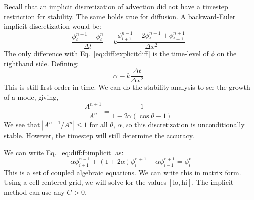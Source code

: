 Recall that an implicit discretization of advection did not have a
timestep restriction for stability.  The same holds true for
diffusion.  A backward-Euler implicit discretization would be:
\begin{equation}
\label{eq:diff:foimplicit}
\frac{\phi_i^{n+1} - \phi_i^n}{\Delta t} = 
  k \frac{\phi_{i+1}^{n+1} - 2\phi_i^{n+1} + \phi_{i-1}^{n+1}}{\Delta x^2}
\end{equation}
The only difference with Eq.~\ref{eq:diff:explicitdiff} is the
time-level of $\phi$ on the righthand side.  Defining:
\begin{equation}
\alpha \equiv k \frac{\Delta t}{\Delta x^2}
\end{equation}
This is still first-order in time.  We can do the stability analysis
to see the growth of a mode, giving,
\begin{equation}
\frac{A^{n+1}}{A^n} = \frac{1}{1 - 2\alpha (\cos\theta - 1)}
\end{equation}
We see that $|A^{n+1}/A^n| \le 1$ for all $\theta$, $\alpha$, so this
discretization is unconditionally stable.  However, the timestep will
still determine the accuracy.

We can write Eq.~\ref{eq:diff:foimplicit} as:
\begin{equation}
\label{eq:diff:implicit}
-\alpha \phi_{i+1}^{n+1} + (1 + 2\alpha) \phi_{i}^{n+1} - \alpha \phi_{i-1}^{n+1} = \phi_i^n
\end{equation}
This is a set of coupled algebraic equations.  We can write this in
matrix form.  Using a cell-centered grid, we will solve for the values
$[\mathrm{lo},\mathrm{hi}]$.  
The implicit method can use any $C > 0$.

